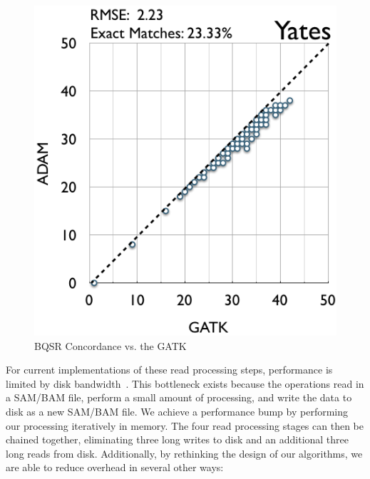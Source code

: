 \documentclass{acm_proc_article-sp}
\begin{document}
\begin{figure}[h]
\begin{center}
\includegraphics[width=0.9\linewidth]{graphs/bqsr-concordance.png}
\end{center}
\caption{BQSR Concordance vs. the GATK}
\label{fig:bqsr-concordance}
\end{figure}

For current implementations of these read processing steps, performance is limited by disk
bandwidth~\cite{diao15}. This bottleneck exists because the operations read in a SAM/BAM file, perform a
small amount of processing, and write the data to disk as a new SAM/BAM file. We achieve a performance
bump by performing our processing iteratively in memory. The four read processing stages can then be
chained together, eliminating three long writes to disk and an additional three long reads from disk.
Additionally, by rethinking the design of our algorithms, we are able to reduce overhead in several other
ways:
\end{document}
